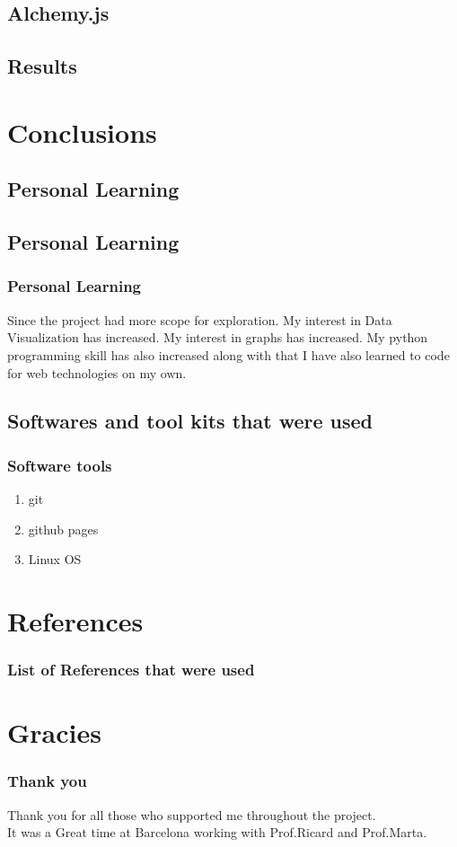 \documentclass{beamer}
\begin{document}
\subsection[Experiments]{Alchemy.js} \frame{}
\subsection{Results} \frame{}




\section{Conclusions}

\subsection{Personal Learning}


\subsection{Personal Learning}

\frame
{
	\frametitle{Personal Learning}
Since the project had more scope for exploration.
My interest in Data Visualization has increased.
My interest in graphs has increased.
My python programming skill has also increased along with that I have also learned to code for web technologies on my own.
}

\subsection{Softwares and tool kits that were used}

\frame
{
	\frametitle{Software tools}
	\begin{enumerate}
		\item git
		\item github pages
		\item Linux OS
	\end{enumerate}
}



\section{References}

\frame
{
	\frametitle{List of References that were used}


{}
}
\section{Gracies}

\frame
{
	\frametitle{Thank you}
Thank you for all those who supported me throughout the project.\\
It was a Great time at Barcelona working with Prof.Ricard and Prof.Marta.


{}
}
\end{document}
